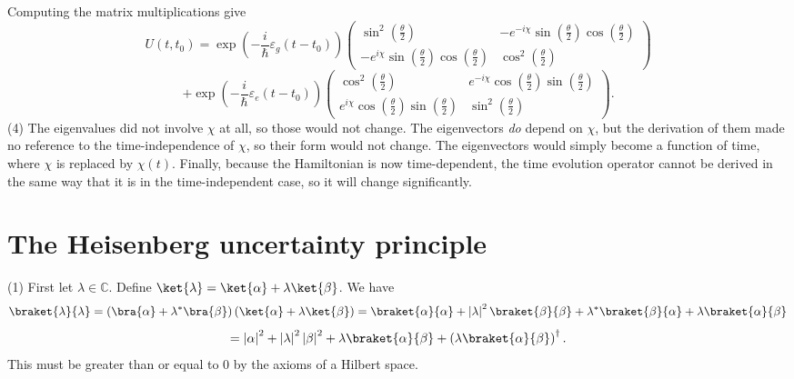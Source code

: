 \documentclass[11pt, letterpaper]{article}
\begin{document}
Computing the matrix multiplications give
\[
	U(t,t_0)=\exp \left( -\frac{i}{\hbar} \varepsilon _g(t-t_0) \right) \begin{pmatrix}
		\displaystyle{\sin ^2\left( \frac{\theta }{2}  \right)} & \displaystyle{-e^{-i\chi } \sin \left( \frac{\theta }{2}  \right) \cos \left( \frac{\theta }{2}  \right) } \\
\displaystyle{-e^{i\chi } \sin \left( \frac{\theta }{2}  \right) \cos \left( \frac{\theta }{2}  \right)  }& \displaystyle{\cos ^2\left( \frac{\theta }{2}  \right) }
	\end{pmatrix}
\]
\[
	+\exp \left( -\frac{i}{\hbar} \varepsilon _e(t-t_0) \right) \begin{pmatrix}
		\displaystyle{\cos ^2\left( \frac{\theta }{2}  \right) } & \displaystyle{e^{-i\chi } \cos \left( \frac{\theta }{2}  \right) \sin \left( \frac{\theta }{2}  \right) } \\
		\displaystyle{e^{i\chi } \cos \left( \frac{\theta }{2}  \right) \sin \left( \frac{\theta }{2}  \right) } & \displaystyle{\sin ^2\left( \frac{\theta }{2}  \right) }
	\end{pmatrix}
.\]
(4) The eigenvalues did not involve $\chi $ at all, so those would not change. The eigenvectors \emph{do} depend on $\chi $, but the derivation of them made no reference to the time-independence of $\chi $, so their form would not change. The eigenvectors would simply become a function of time, where $\chi $ is replaced by $\chi (t)$. Finally, because the Hamiltonian is now time-dependent, the time evolution operator cannot be derived in the same way that it is in the time-independent case, so it will change significantly.

\section{The Heisenberg uncertainty principle}

(1) First let $\lambda \in\mathbb{C} $. Define $\ket{\lambda }=\ket{\alpha }+\lambda \ket{\beta }$. We have
\[
	\braket{\lambda }{\lambda }=\left( \bra{\alpha }+\lambda ^*\bra{\beta } \right) \left( \ket{\alpha }+\lambda \ket{\beta } \right) =\braket{\alpha }{\alpha }+\left| \lambda  \right| ^2 \braket{\beta }{\beta }+\lambda ^*\braket{\beta }{\alpha }+\lambda \braket{\alpha }{\beta }
\]
\[
	=\left| \alpha  \right| ^2+\left| \lambda  \right| ^2\left| \beta  \right| ^2+\lambda \braket{\alpha }{\beta }+\left( \lambda \braket{\alpha }{\beta } \right) ^\dagger
.\]
This must be greater than or equal to $0$ by the axioms of a Hilbert space.
\end{document}
